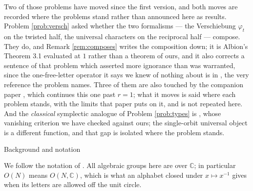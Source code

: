 \documentclass[11pt,reqno]{amsart}
\makeatletter
\renewcommand\section{\@startsection{section}{1}%
  \z@{\linespacing\@plus\linespacing}{.5\linespacing}%
  {\normalfont\large\bfseries\centering}}
\theoremstyle{plain}
\theoremstyle{definition}
\newcommand{\CC}{\mathbb{C}}
\makeatother
\begin{document}
Two of those problems have moved since the first version, and both moves are recorded where the
problems stand rather than announced here as results. Problem \ref{prob:versch} asked whether the
two formalisms --- the Verschiebung $\varphi_t$ on the twisted half, the universal characters on the
reciprocal half --- compose. They do, and Remark \ref{rem:composes} writes the composition down; it
is Albion's Theorem 3.1 evaluated at $1$ rather than a theorem of ours, and it also corrects a
sentence of that problem which asserted more ignorance than was warranted, since the one-free-letter
operator it says we knew of nothing about is in \cite[\S6.1]{Alb23}, the very reference the problem
names. Three of them are also touched by the companion paper \cite{PaperII}, which continues
this one past $r=1$; what it moves is said where each problem stands, with the limits that paper
puts on it, and is not repeated here. And the \emph{classical} symplectic analogue of Problem \ref{prob:types} is
\cite[Theorem 2.8]{Kum24}, whose vanishing criterion we have checked against ours; the single-orbit
universal object is a different function, and that gap is isolated where the problem stands.

\section{Background and notation}\label{sec:background}

We follow the notation of \cite{AK22,AK25}. All algebraic groups here are over $\CC$; in particular
$O(N)$ means $O(N,\CC)$, which is what an alphabet closed under $x\mapsto x^{-1}$ gives when its
letters are allowed off the unit circle.
\end{document}
